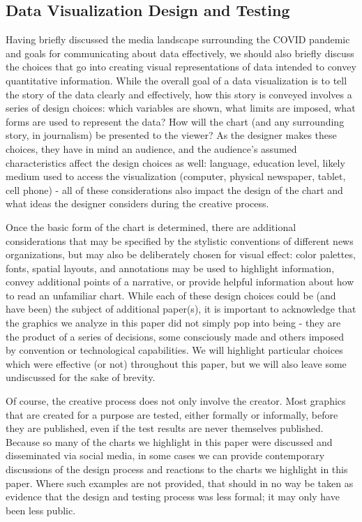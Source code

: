 \documentclass[article]{jdssv}\usepackage[]{graphicx}\usepackage[]{xcolor}
\begin{document}
\subsection{Data Visualization Design and Testing}
Having briefly discussed the media landscape surrounding the COVID pandemic and goals for communicating about data effectively, we should also briefly discuss the choices that go into creating visual representations of data intended to convey quantitative information.
While the overall goal of a data visualization is to tell the story of the data clearly and effectively, how this story is conveyed involves a series of design choices: which variables are shown, what limits are imposed, what forms are used to represent the data? 
How will the chart (and any surrounding story, in journalism) be presented to the viewer? 
As the designer makes these choices, they have in mind an audience, and the audience's assumed characteristics affect the design choices as well: language, education level, likely medium used to access the visualization (computer, physical newspaper, tablet, cell phone) - all of these considerations also impact the design of the chart and what ideas the designer considers during the creative process.

Once the basic form of the chart is determined, there are additional considerations that may be specified by the stylistic conventions of different news organizations, but may also be deliberately chosen for visual effect: color palettes, fonts, spatial layouts, and annotations may be used to highlight information, convey additional points of a narrative, or provide helpful information about how to read an unfamiliar chart.
While each of these design choices could be (and have been) the subject of  additional paper(s), it is important to acknowledge that the graphics we analyze in this paper did not simply pop into being - they are the product of a series of decisions, some consciously made and others imposed by convention or technological capabilities.
We will highlight particular choices which were effective (or not) throughout this paper, but we will also leave some undiscussed for the sake of brevity.

Of course, the creative process does not only involve the creator. Most graphics that are created for a purpose are tested, either formally or informally, before they are published, even if the test results are never themselves published. Because so many of the charts we highlight in this paper were discussed and disseminated via social media, in some cases we can provide contemporary discussions of the design process and reactions to the charts we highlight in this paper. Where such examples are not provided, that should in no way be taken as evidence that the design and testing process was less formal; it may only have been less public.
\end{document}
